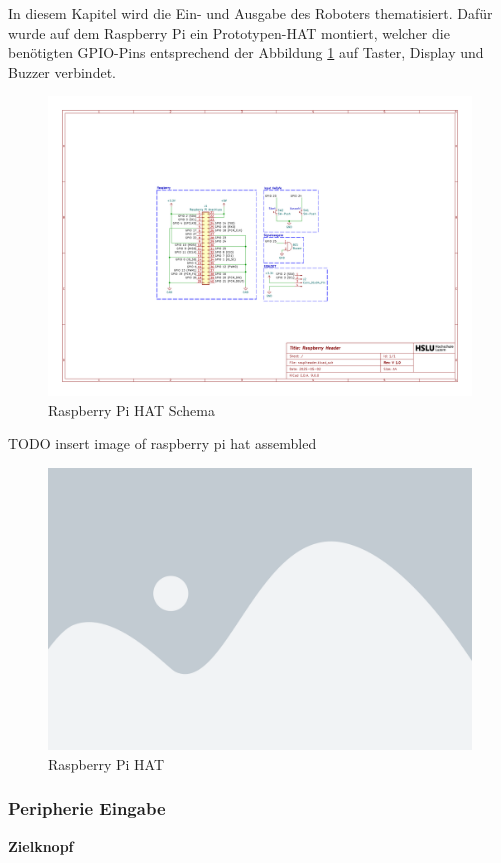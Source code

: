 In diesem Kapitel wird die Ein- und Ausgabe des Roboters thematisiert.
Dafür wurde auf dem Raspberry Pi ein Prototypen-HAT montiert, welcher die benötigten GPIO-Pins entsprechend der Abbildung \ref{fig:raspiheader-schema} auf Taster, Display und Buzzer verbindet.

\begin{figure}[H]
    \centering
    \includegraphics[width=\linewidth, trim=7.5cm 6cm 10cm 6cm, clip]{assets/ET/PCB/raspiheader.pdf}
    \caption{Raspberry Pi HAT Schema}
    \label{fig:raspiheader-schema}
\end{figure}

TODO insert image of raspberry pi hat assembled
\begin{figure}[H]
    \centering
    \includegraphics[width=0.5\linewidth]{assets/placeholder.png}
    \caption{Raspberry Pi HAT}
    \label{fig:raspiheader-assembly}
\end{figure}

\subsubsection{Peripherie Eingabe}
\label{zieleingabe}

\textbf{Zielknopf}

